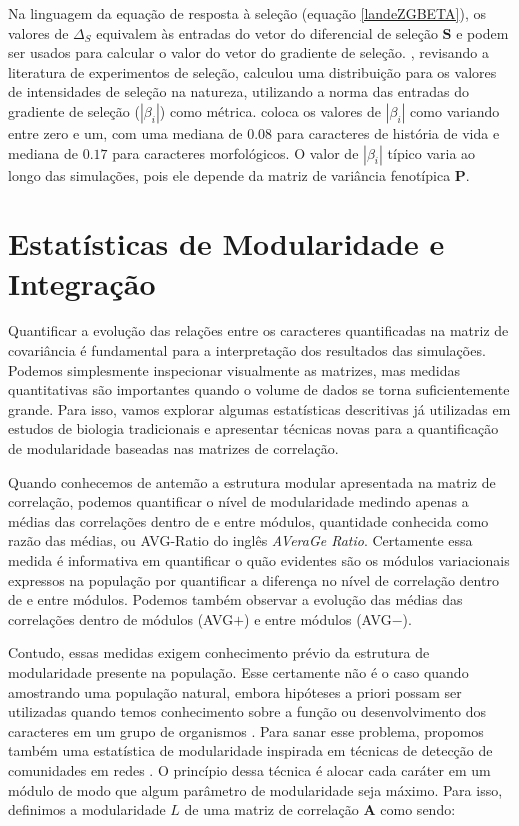 Na linguagem da equação de resposta à seleção (equação
\ref{landeZGBETA}), os valores de $\Delta_S$ equivalem às entradas do
vetor do diferencial de seleção $\mathbf{S}$ e podem ser usados para
calcular o valor do vetor do gradiente de seleção.
\cite{Kingsolver2001}, revisando a literatura de experimentos de
seleção, calculou uma distribuição para os valores de intensidades de
seleção na natureza, utilizando a norma das entradas do gradiente de seleção
($|\beta_i|$) como métrica.
\cite{Kingsolver2001} coloca os valores de
$|\beta_i|$ como variando entre zero e um, com uma mediana de $0.08$
para caracteres de história de vida e mediana de $0.17$ para
caracteres morfológicos.
O valor de $|\beta_i|$ típico varia ao longo das simulações, pois ele
depende da matriz de variância fenotípica $\mathbf{P}$.

\section{Estatísticas de Modularidade e Integração}

Quantificar a evolução das relações entre os caracteres quantificadas na
matriz de covariância é fundamental para a interpretação dos resultados
das simulações.
Podemos simplesmente inspecionar visualmente as matrizes, mas medidas
quantitativas são importantes quando o volume de dados se torna
suficientemente grande.
Para isso, vamos explorar algumas estatísticas descritivas já utilizadas em
estudos de biologia tradicionais e apresentar técnicas novas para a
quantificação de modularidade baseadas nas matrizes de correlação.

Quando conhecemos de antemão a estrutura modular apresentada na matriz
de correlação, podemos quantificar o nível de modularidade medindo
apenas a médias das correlações dentro de e entre módulos, quantidade
conhecida como razão das médias, ou AVG-Ratio do inglês {\it AVeraGe Ratio}.
Certamente essa medida é informativa em quantificar o quão evidentes são
os módulos variacionais expressos na população por quantificar a
diferença no nível de correlação dentro de e entre módulos.
Podemos também observar a evolução das médias das correlações dentro
de módulos (AVG$+$) e entre módulos (AVG$-$).

Contudo, essas medidas exigem conhecimento prévio da estrutura de
modularidade presente na população.
Esse certamente não é o caso quando amostrando uma população natural,
embora hipóteses a priori possam ser utilizadas quando temos conhecimento
sobre a função ou desenvolvimento dos caracteres em um grupo de
organismos \citep{Cheverud1985a, Marroig2001}.
Para sanar esse problema, propomos também uma estatística de
modularidade inspirada em técnicas de detecção de comunidades em redes
\citep{Newman2006,Newman2006a,Reichardt2006}.
O princípio dessa técnica é alocar cada caráter em um módulo de modo que
algum parâmetro de modularidade seja máximo.
Para isso, definimos a modularidade $L$ de uma matriz de correlação
$\mathbf{A}$
como sendo:

